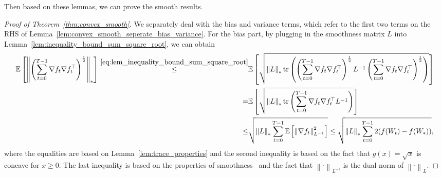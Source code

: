 \documentclass{article}
\theoremstyle{remark}
\newcommand{\Norm}[1]{\left\|#1\right\|}
\newcommand{\tr}[1]{{\rm tr}\left( #1 \right)}
\newcommand{\EE}{\mathbb{E}}
\begin{document}
Then based on these lemmas, we can prove the smooth results.
\begin{proof}[Proof of Theorem~\ref{thm:convex_smooth}]
    We separately deal with the bias and variance terms, which refer to the first two terms on the RHS of Lemma~\ref{lem:convex_smooth_seperate_bias_variance}. For the bias part, by plugging in the smoothness matrix $L$ into Lemma~\ref{lem:inequality_bound_sum_square_root}, we can obtain
    \begin{align*}
        \EE\left[ \Norm{\left( \sum_{t=0}^{T-1} \nabla f_t \nabla f_t^\top \right)^{\frac{1}{2}}}_* \right] \overset{\eqref{eq:lem_inequality_bound_sum_square_root}}{\le}& \EE\left[ \sqrt{\Norm{L}_* \tr{\left( \sum_{t=0}^{T-1} \nabla f_t \nabla f_t^\top \right)^{\frac{1}{2}} L^{-1} \left( \sum_{t=0}^{T-1} \nabla f_t \nabla f_t^\top \right)^{\frac{1}{2}}}} \right] \\
        =&
        \EE\left[ \sqrt{\Norm{L}_* \tr{ \sum_{t=0}^{T-1} \nabla f_t \nabla f_t^\top L^{-1} }} \right] \\
        \le&
        \sqrt{\Norm{L}_* \sum_{t=0}^{T-1} \EE\left[\Norm{\nabla f_t}_{L^{-1 }}^2\right]} \le \sqrt{\Norm{L}_* \sum_{t=0}^{T-1} 2(f(W_t) - f(W_*))} ,
    \end{align*}
    where the equalities are based on Lemma~\ref{lem:trace_properties} and the second inequality is based on the fact that $g(x) = \sqrt{x}$ is concave for $x \ge 0$. The last inequality is based on the properties of smoothness~\citep{nesterov2018lectures} and the fact that $\Norm{\cdot}_{L^{-1}}$ is the dual norm of $\Norm{\cdot}_L$.


\end{proof}
\end{document}
